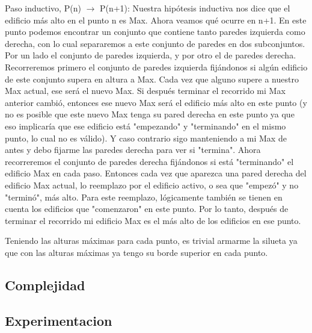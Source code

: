 Paso inductivo, P(n) $\rightarrow$ P(n+1):
Nuestra hipótesis inductiva nos dice que el edificio más alto en el punto n es Max. Ahora veamos qué ocurre en n+1. En este punto podemos encontrar un conjunto que contiene tanto paredes izquierda como derecha, con lo cual separaremos a este conjunto de paredes en dos subconjuntos. Por un lado el conjunto de paredes izquierda, y por otro el de paredes derecha. Recorreremos primero el conjunto de paredes izquierda fijándonos si algún edificio de este conjunto supera en altura a Max. Cada vez que alguno supere a nuestro Max actual, ese será el nuevo Max. Si después terminar el recorrido mi Max anterior cambió, entonces ese nuevo Max será el edificio más alto en este punto (y no es posible que este nuevo Max tenga su pared derecha en este punto ya que eso implicaría que ese edificio está "empezando" y "terminando" en el mismo punto, lo cual no es válido). Y caso contrario sigo manteniendo a mi Max de antes y debo fijarme las paredes derecha para ver si "termina".
Ahora recorreremos el conjunto de paredes derecha fijándonos si está "terminando" el edificio Max en cada paso. Entonces cada vez que aparezca una pared derecha del edificio Max actual, lo reemplazo por el edificio activo, o sea que "empezó" y no "terminó", más alto. Para este reemplazo, lógicamente también se tienen en cuenta los edificios que "comenzaron" en este punto. Por lo tanto, después de terminar el recorrido mi edificio Max es el más alto de los edificios en ese punto.

Teniendo las alturas máximas para cada punto, es trivial armarme la silueta ya que con las alturas máximas ya tengo su borde superior en cada punto.


\subsection{Complejidad}

\subsection{Experimentacion}

  




